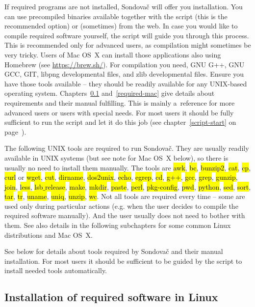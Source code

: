 \documentclass[a4paper, 11pt, twoside]{article}
\renewcommand{\texttt}[1]{\hl{\ttfamily #1}}
\begin{document}
If required programs are not installed, Sondovač will offer you installation. You can use precompiled binaries available together with the script (this is the recommended option) or (sometimes) from the web. In case you would like to compile required software yourself, the script will guide you through this process. This is recommended only for advanced users, as compilation might sometimes be very tricky. Users of Mac OS~X can install those applications also using Homebrew (see \url{https://brew.sh/}). For compilation you need, GNU G++, GNU GCC, GIT, libpng developmental files, and zlib developmental files. Ensure you have those tools available -- they should be readily available for any UNIX-based operating system. Chapters~\ref{required-linux} and~\ref{required-mac} give details about requirements and their manual fulfilling. This is mainly a~reference for more advanced users or users with special needs. For most users it should be fully sufficient to run the script and let it do this job (see chapter~\ref{script-start} on page~\pageref{script-usage}).

The following UNIX tools are required to run Sondovač. They are usually readily available in UNIX systems (but see note for Mac OS~X below), so there is usually no need to install them manually. The tools are \texttt{awk}, \texttt{bc}, \texttt{bunzip2}, \texttt{cat}, \texttt{cp}, \texttt{curl} or \texttt{wget}, \texttt{cut}, \texttt{dirname}, \texttt{dos2unix}, \texttt{echo}, \texttt{egrep}, \texttt{cd}, \texttt{g++}, \texttt{gcc}, \texttt{grep}, \texttt{gunzip}, \texttt{join}, \texttt{less}, \texttt{lsb$\_$release}, \texttt{make}, \texttt{mkdir}, \texttt{paste}, \texttt{perl}, \texttt{pkg-config}, \texttt{pwd}, \texttt{python}, \texttt{sed}, \texttt{sort}, \texttt{tar}, \texttt{tr}, \texttt{uname}, \texttt{uniq}, \texttt{unzip}, \texttt{wc}. Not all tools are required every time -- some are used only during particular actions (e.g. when the user decides to compile the required software manually). And the user usually does not need to bother with them. See also details in the following subchapters for some common Linux distributions and Mac OS~X.

See below for details about tools required by Sondovač and their manual installation. For most users it should be sufficient to be guided by the script to install needed tools automatically.

\subsection{Installation of required software in Linux} %
\label{required-linux}
\end{document}
